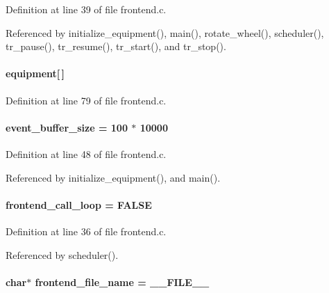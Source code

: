Definition at line 39 of file frontend.c.

Referenced by initialize\_\-equipment(), main(), rotate\_\-wheel(), scheduler(), tr\_\-pause(), tr\_\-resume(), tr\_\-start(), and tr\_\-stop().
\paragraph[{equipment}]{ {\bf equipment}\mbox{[}$\,$\mbox{]}}\hfill\label{frontend_8c_aa86ef8764826784b74603ffb23852283}


Definition at line 79 of file frontend.c.
\paragraph[{event\_\-buffer\_\-size}]{ {\bf event\_\-buffer\_\-size} = 100 $\ast$ 10000}\hfill\label{frontend_8c_a4411d7db6f901c968b946ed659d202f6}


Definition at line 48 of file frontend.c.

Referenced by initialize\_\-equipment(), and main().
\paragraph[{frontend\_\-call\_\-loop}]{ {\bf frontend\_\-call\_\-loop} = FALSE}\hfill\label{frontend_8c_a0215c0a842a0e97fe65c7ef5fb7633a5}


Definition at line 36 of file frontend.c.

Referenced by scheduler().
\paragraph[{frontend\_\-file\_\-name}]{\setlength{\rightskip}{0pt plus 5cm}char$\ast$ {\bf frontend\_\-file\_\-name} = \_\-\_\-FILE\_\-\_\-}\hfill\label{frontend_8c_ac7fc683b5a25d9607abc270a54db6d97}


